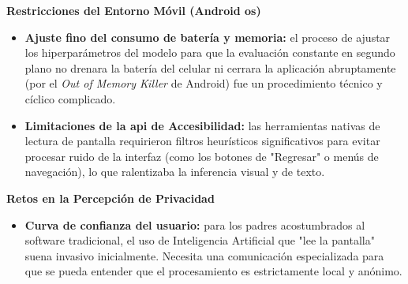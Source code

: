 \textbf{Restricciones del Entorno Móvil (Android \gls{os})} \\
\begin{itemize}
    \item \textbf{Ajuste fino del consumo de batería y memoria:} el proceso de ajustar los hiperparámetros del modelo para que la evaluación constante en segundo plano no drenara la batería del celular ni cerrara la aplicación abruptamente (por el \textit{Out of Memory Killer} de Android) fue un procedimiento técnico y cíclico complicado.
    \item \textbf{Limitaciones de la \gls{api} de Accesibilidad:} las herramientas nativas de lectura de pantalla requirieron filtros heurísticos significativos para evitar procesar ruido de la interfaz (como los botones de "Regresar" o menús de navegación), lo que ralentizaba la inferencia visual y de texto.
\end{itemize}

\textbf{Retos en la Percepción de Privacidad} \\
\begin{itemize}
    \item \textbf{Curva de confianza del usuario:} para los padres acostumbrados al software tradicional, el uso de Inteligencia Artificial que "lee la pantalla" suena invasivo inicialmente. Necesita una comunicación especializada para que se pueda entender que el procesamiento es estrictamente local y anónimo.
\end{itemize}

